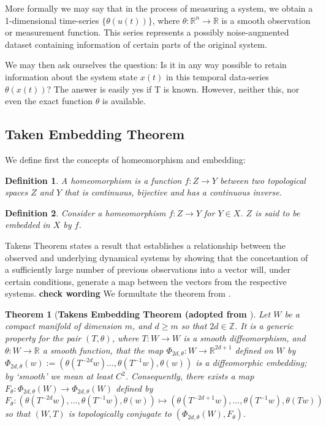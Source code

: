 \documentclass[12 pt]{article}
\newtheorem{Definition}{Definition}[]
\newtheorem{Theorem}{Theorem}[]
\newcommand{\Ftheta}{\ensuremath{F_\theta}}
\begin{document}
More formally we may say that in the process of measuring a system, we obtain a 1-dimensional time-series $\{\theta(u(t))\}$, where $\theta:\mathbb{R}^n\to\mathbb{R}$ is a smooth observation or measurement function. This series represents a possibly noise-augmented dataset containing information of certain parts of the original system. 

We may then ask ourselves the question: Is it in any way possible to retain information about the system state $x(t)$ in this temporal data-series $\theta(x(t))$? The answer is easily yes if T is known. However, neither this, nor even the exact function $\theta$ is available. 

\subsection{Taken Embedding Theorem}

We define first the concepts of homeomorphism and embedding:
\begin{Definition}
  A homeomorphism is a function $f:Z\rightarrow Y$ between two topological spaces $Z$ and $Y$ that is continuous, bijective and has a continuous inverse. 
\end{Definition}

\begin{Definition}
  Consider a homeomorphism $f:Z\rightarrow Y$ for $Y\in X$. $Z$ is said to be embedded in $X$ by $f$.
\end{Definition}

Takens Theorem states a result that establishes a relationship between the observed and underlying dynamical systems by showing that the concetantion of a sufficiently large number of previous observations into a vector will, under certain conditions, generate a map between the vectors from the respective systems. \textbf{check wording} We formultate the theorem from \cite{takens1981detecting}.  

\begin{Theorem} 
	[\bf Takens Embedding Theorem (adopted from \cite{takens1981detecting}] \label{Thm_Takens}
            Let $W$ be a compact manifold of dimension $m$, and $d\ge m$ so that $2d\in\mathbb{Z}$. It is a 
            generic property for the pair $(T, \theta)$,  where $T:W \to W$ is
            a smooth diffeomorphism, and $\theta:W \to \mathbb{R}$ a smooth function, that the map $\Phi_{2d,\theta}:W \to \mathbb{R}^{2d+1}$ defined on $W$ by 
            $\Phi_{2d,\theta}(w) := (\theta(T^{-2d}w)\ldots,\theta(T^{-1}w),\theta(w))$
            is a diffeomorphic embedding; by `smooth' we mean at least $C^2$. Consequently, there exists a map $\Ftheta: \Phi_{2d,\theta}(W) \to \Phi_{2d,\theta}(W)$ defined by 
            \begin{equation}  \label{eqn_takens}
              \Ftheta: (\theta(T^{-2d}w),\ldots,\theta(T^{-1}w),\theta(w)) \mapsto  (\theta(T^{-2d+1}w),\ldots,\theta(T^{-1}w),\theta(Tw))
            \end{equation}
           so that $(W,T)$ is topologically conjugate to 
            $(\Phi_{2d,\theta}(W), \Ftheta)$. 
\end{Theorem} 
\end{document}
